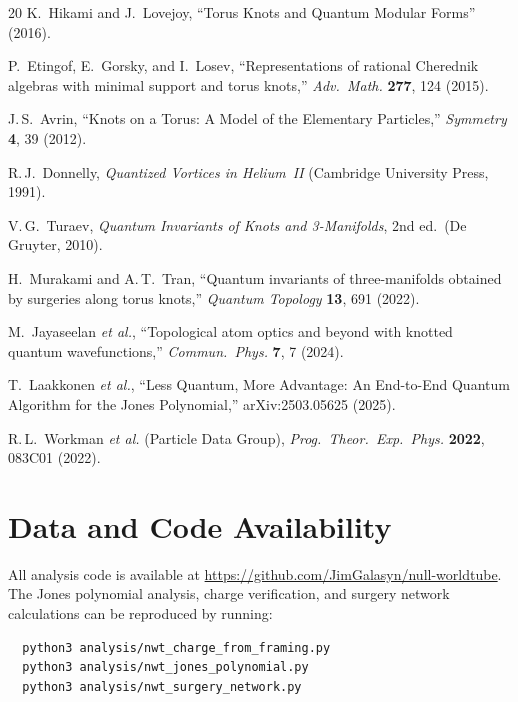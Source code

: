 \documentclass[11pt,a4paper]{article}
\begin{document}
\begin{thebibliography}{20}
K.~Hikami and J.~Lovejoy,
``Torus Knots and Quantum Modular Forms'' (2016).

P.~Etingof, E.~Gorsky, and I.~Losev,
``Representations of rational Cherednik algebras with
minimal support and torus knots,''
\emph{Adv.\ Math.} \textbf{277}, 124 (2015).

J.\,S.~Avrin,
``Knots on a Torus: A Model of the Elementary Particles,''
\emph{Symmetry} \textbf{4}, 39 (2012).

R.\,J.~Donnelly,
\emph{Quantized Vortices in Helium~II}
(Cambridge University Press, 1991).

V.\,G.~Turaev,
\emph{Quantum Invariants of Knots and 3-Manifolds},
2nd ed.\ (De Gruyter, 2010).

H.~Murakami and A.\,T.~Tran,
``Quantum invariants of three-manifolds obtained by
surgeries along torus knots,''
\emph{Quantum Topology} \textbf{13}, 691 (2022).

M.~Jayaseelan \textit{et al.},
``Topological atom optics and beyond with knotted quantum
wavefunctions,''
\emph{Commun.\ Phys.} \textbf{7}, 7 (2024).

T.~Laakkonen \textit{et al.},
``Less Quantum, More Advantage: An End-to-End Quantum Algorithm
for the Jones Polynomial,''
arXiv:2503.05625 (2025).

R.\,L.~Workman \textit{et al.} (Particle Data Group),
\emph{Prog.\ Theor.\ Exp.\ Phys.} \textbf{2022}, 083C01 (2022).

\end{thebibliography}

\section*{Data and Code Availability}

All analysis code is available at
\url{https://github.com/JimGalasyn/null-worldtube}.
The Jones polynomial analysis, charge verification, and
surgery network calculations can be reproduced by running:
\begin{verbatim}
  python3 analysis/nwt_charge_from_framing.py
  python3 analysis/nwt_jones_polynomial.py
  python3 analysis/nwt_surgery_network.py
\end{verbatim}
\end{document}
